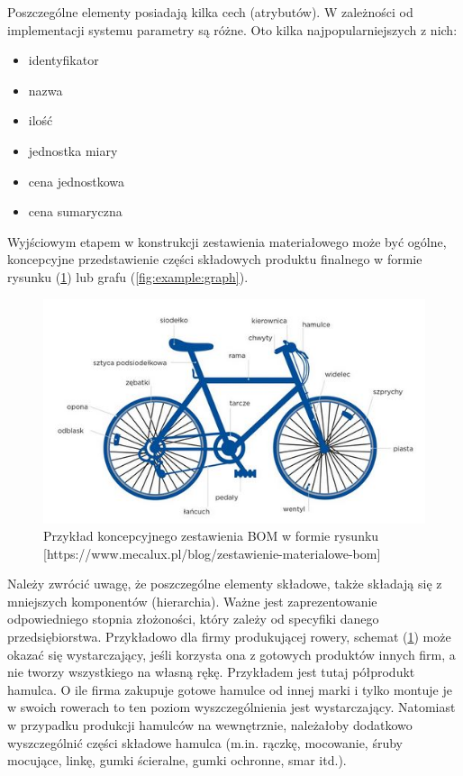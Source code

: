 \documentclass[12pt,twoside]{article}
\begin{document}
Poszczególne elementy posiadają kilka cech (atrybutów). W zależności od implementacji systemu parametry są różne. Oto kilka najpopularniejszych z nich:

\begin{itemize}[label=-,labelsep=0.4cm,leftmargin=0.6cm]
\item identyfikator
\item nazwa
\item ilość
\item jednostka miary
\item cena jednostkowa
\item cena sumaryczna
\end{itemize}

Wyjściowym etapem w konstrukcji zestawienia materiałowego może być ogólne, koncepcyjne przedstawienie części składowych produktu finalnego w formie rysunku (\ref{fig:example:drawing}) lub grafu (\ref{fig:example:graph}).

\begin{figure}[h]
	\centering
	\includegraphics[width=\textwidth]{figures/examples/drawing.jpg}
	\caption{Przykład koncepcyjnego zestawienia BOM w formie rysunku [https://www.mecalux.pl/blog/zestawienie-materialowe-bom]}
\label{fig:example:drawing}
\end{figure}

Należy zwrócić uwagę, że poszczególne elementy składowe, także składają się z mniejszych komponentów (hierarchia). Ważne jest zaprezentowanie odpowiedniego stopnia złożoności, który zależy od specyfiki danego przedsiębiorstwa. Przykładowo dla firmy produkującej rowery, schemat (\ref{fig:example:drawing}) może okazać się wystarczający, jeśli korzysta ona z gotowych produktów innych firm, a nie tworzy wszystkiego na własną rękę. Przykładem jest tutaj półprodukt hamulca. O ile firma zakupuje gotowe hamulce od innej marki i tylko montuje je w swoich rowerach to ten poziom wyszczególnienia jest wystarczający. Natomiast w przypadku produkcji hamulców na wewnętrznie, należałoby dodatkowo wyszczególnić części składowe hamulca (m.in. rączkę, mocowanie, śruby mocujące, linkę, gumki ścieralne, gumki ochronne, smar itd.).
\end{document}
